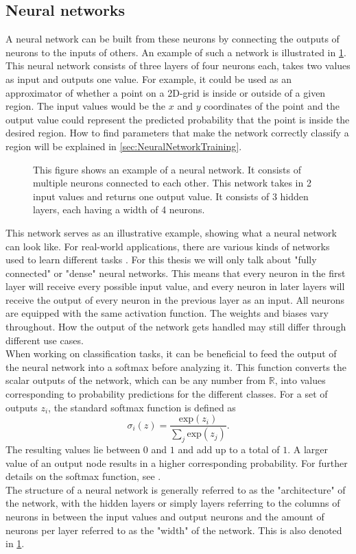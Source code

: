 \subsection{Neural networks}\label{sec:NeuralNetworks}
A neural network can be built from these neurons by connecting the outputs of neurons to the inputs of others. An example of such a network is illustrated in \cref{fig:Neural_network_example}. This neural network consists of three layers of four neurons each, takes two values as input and outputs one value. For example, it could be used as an approximator of whether a point on a 2D-grid is inside or outside of a given region. The input values would be the $x$ and $y$ coordinates of the point and the output value could represent the predicted probability that the point is inside the desired region. How to find parameters that make the network correctly classify a region will be explained in \cref{sec:NeuralNetworkTraining}.\\
\begin{figure}
	\centering
	
	\caption{This figure shows an example of a neural network. It consists of multiple neurons connected to each other. This network takes in 2 input values and returns one output value. It consists of 3 hidden layers, each having a width of 4 neurons.}
	\label{fig:Neural_network_example}
\end{figure}
This network serves as an illustrative example, showing what a neural network can look like. For real-world applications, there are various kinds of networks used to learn different tasks \cite{DeepLearningTaxonomy}. For this thesis we will only talk about "fully connected" or "dense" neural networks. This means that every neuron in the first layer will receive every possible input value, and every neuron in later layers will receive the output of every neuron in the previous layer as an input. All neurons are equipped with the same activation function. The weights and biases vary throughout. How the output of the network gets handled may still differ through different use cases. \\
When working on classification tasks, it can be beneficial to feed the output of the neural network into a softmax before analyzing it. This function converts the scalar outputs of the network, which can be any number from $\mathbb{R}$, into values corresponding to probability predictions for the different classes. For a set of outputs $z_i$, the standard softmax function is defined as 
\begin{equation}
	\sigma_i(z) = \frac{\mathrm{exp}(z_i)}{\sum_j \mathrm{exp}(z_j)}.
\end{equation}
The resulting values lie between $0$ and $1$ and add up to a total of $1$. A larger value of an output node results in a higher corresponding probability. For further details on the softmax function, see \cite{gao2018properties}.\\
The structure of a neural network is generally referred to as the "architecture" of the network, with the hidden layers or simply layers referring to the columns of neurons in between the input values and output neurons and the amount of neurons per layer referred to as the "width" of the network. This is also denoted in \cref{fig:Neural_network_example}. 
